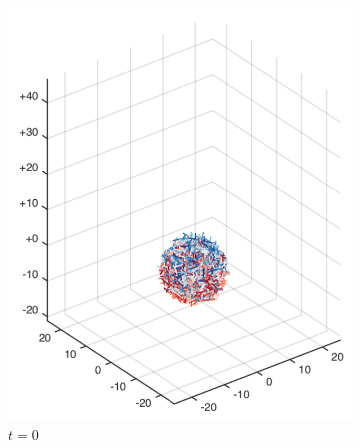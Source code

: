 \begin{figure}[htbp]
  \centering
  \begin{subfigure}[h]{0.24\textwidth}
    \centering
    \includegraphics[width=\textwidth]{img/mixing/random_00000.pdf}
    \caption{$t=0$}\label{fig:mixing_random_a}
  \end{subfigure}
  \begin{subfigure}[h]{0.24\textwidth}
    \centering

\end{subfigure}
\end{figure}

